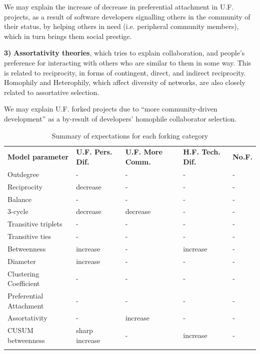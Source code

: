 \documentclass{acm_proc_article-sp}
\begin{document}
We may explain the increase of decrease in preferential attachment in U.F. projects, as a result of software developers signalling others in the community of their status, by helping others in need (i.e. peripheral community members), which in turn brings them social prestige.

\textbf{3)} \textbf{Assortativity theories}, which tries to explain collaboration, and people's preference for interacting with others who are similar to them in some way. This is related to reciprocity, in forms of contingent, direct, and indirect reciprocity. Homophily and Heterophily, which affect diversity of networks, are also closely related to assortative selection.

We may explain U.F. forked projects due to ``more community-driven development'' as a by-result of developers' homophile collaborator selection.


\begin{table} [!Ht]
\centering
\caption{Summary of expectations for each forking category}
\label{tabelSummaryExpectationModelParameters}       
\begin{tabular}{m{} m{} m{} m{} m{}}
\hline\noalign{\smallskip}
\textbf{Model parameter} & \textbf{U.F. Pers. Dif.} & \textbf{U.F. More Comm.} & \textbf{H.F. Tech. Dif.} & \textbf{No.F.}\\
\noalign{\smallskip}\hline\noalign{\smallskip}
Outdegree & - & - & - & - \\ \hline
Reciprocity & decrease & - & - & - \\ \hline
Balance & - & - & - & - \\ \hline
3-cycle & decrease & decrease & - & - \\ \hline
Transitive triplets & - & - & - & - \\ \hline
Transitive ties & - & - & - & - \\ \hline
Betweenness & increase & - & increase & - \\ \hline
Diameter & increase & - & - & - \\ \hline
Clustering Coefficient & - & - & - & - \\ \hline
Preferential Attachment & - & - & - & - \\ \hline
Assortativity & - & increase & - & - \\ \hline
CUSUM betweenness & sharp increase & - & increase & - \\
\noalign{\smallskip}\hline
\end{tabular}
\end{table}
\end{document}
